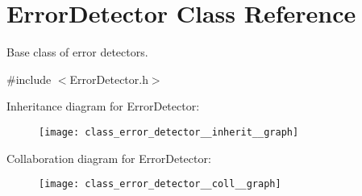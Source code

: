 \hypertarget{class_error_detector}{}\section{Error\+Detector Class Reference}
\label{class_error_detector}


Base class of error detectors.  




{\ttfamily \#include $<$Error\+Detector.\+h$>$}



Inheritance diagram for Error\+Detector\+:\nopagebreak
\begin{figure}[H]
\begin{center}
\leavevmode
\texttt{[image: class\_error\_detector\_\_inherit\_\_graph]}
\end{center}
\end{figure}


Collaboration diagram for Error\+Detector\+:\nopagebreak
\begin{figure}[H]
\begin{center}
\leavevmode
\texttt{[image: class\_error\_detector\_\_coll\_\_graph]}
\end{center}
\end{figure}
